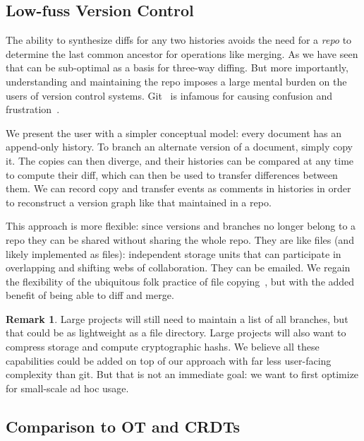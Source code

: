 \documentclass[english,submission]{programming}
\theoremstyle{definition}
\newtheorem*{remark}{Remark}
\begin{document}
\subsection{Low-fuss Version Control}

The ability to synthesize diffs for any two histories avoids the need for a \textit{repo} to determine the last common ancestor for operations like merging. As we have seen that can be sub-optimal as a basis for three-way diffing. But more importantly, understanding and maintaining the repo imposes a large mental burden on the users of version control systems. Git~\cite{ProGit} is infamous for causing confusion and frustration~\cite{perez13, church2014case, xkcd1597}.

We present the user with a simpler conceptual model: every document has an append-only history. To branch an alternate version of a document, simply copy it. The copies can then diverge, and their histories can be compared at any time to compute their diff, which can then be used to transfer differences between them. We can record copy and transfer events as comments in histories in order to reconstruct a version graph like that maintained in a repo.

This approach is more flexible: since versions and branches no longer belong to a repo they can be shared without sharing the whole repo. They are like files (and likely implemented as files): independent storage units that can participate in overlapping and shifting webs of collaboration. They can be emailed. We regain the flexibility of the ubiquitous folk practice of file copying~\cite{Burnett14, Basman19}, but with the added benefit of being able to diff and merge.

\begin{remark}
  Large projects will still need to maintain a list of all branches, but that could be as lightweight as a file directory. Large projects will also want to compress storage and compute cryptographic hashs. We believe all these capabilities could be added on top of our approach with far less user-facing complexity than git. But that is not an immediate goal: we want to first optimize for small-scale ad hoc usage.
\end{remark}

\subsection{Comparison to OT and CRDTs}
\end{document}
